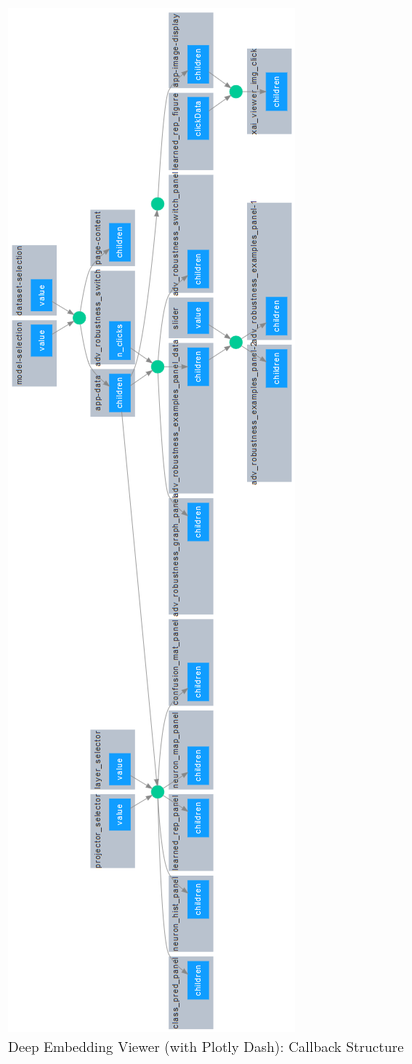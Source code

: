 \newpage


\begin{figure}[H]
	\centering
	\includegraphics[scale=0.9]{images/embedding_view/HRV_Fig_019_DEV_Callback_Structure.PNG}
	\vspace{0.2cm}
	\caption{Deep Embedding Viewer (with Plotly Dash): Callback Structure}
	\label{fig:HRV_Fig_019_DEV_Callback_Structure}
\end{figure}

